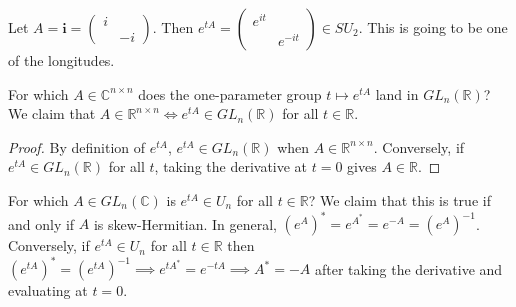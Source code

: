 \documentclass{article}
\newcommand{\C}{\mathbb{C}}
\newcommand{\R}{\mathbb{R}}
\begin{document}
\begin{example}
Let $A=\mathbf i=\begin{pmatrix}
i&\\&-i
\end{pmatrix}$. Then $e^{tA}=\begin{pmatrix}
e^{it}&\\&e^{-it}
\end{pmatrix}\in SU_2$. This is going to be one of the longitudes.
\end{example}
For which $A\in \C^{n\times n}$ does the one-parameter group $t\mapsto e^{tA}$ land in $GL_n(\R)$? We claim that $A\in \R^{n\times n}\iff e^{tA}\in GL_n(\R)$ for all $t\in \R$.
\begin{proof}
By definition of $e^{tA}$, $e^{tA}\in GL_n(\R)$ when $A\in \R^{n\times n}$. Conversely, if $e^{tA}\in GL_n(\R)$ for all $t$, taking the derivative at $t=0$ gives $A\in \R$.
\end{proof}
For which $A\in GL_n(\C)$ is $e^{tA}\in U_n$ for all $t\in \R$? We claim that this is true if and only if $A$ is skew-Hermitian.
In general, $(e^A)^*=e^{A^*}=e^{-A}=(e^A)^{-1}$. Conversely, if $e^{tA}\in U_n$ for all $t\in \R$ then $(e^{tA})^*=(e^{tA})^{-1}\implies e^{tA^*}=e^{-tA}\implies A^*=-A$ after taking the derivative and evaluating at $t=0$.
\end{document}

